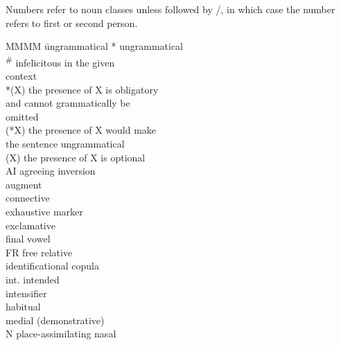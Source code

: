 \documentclass[output=paper]{langscibook}
\begin{document}
Numbers refer to noun classes unless followed by \SG{}/\PL{}, in which case the number refers to first or second person. 

\begin{multicols}{2}
\begin{tabbing}
MMMM \= ungrammatical\kill
* \> ungrammatical\\
\textsuperscript{\#} \> infelicitous in the given \\ \> context\\
*(X) \> the presence of X is obligatory \\ \> and cannot grammatically be \\ \> omitted\\
(*X) \> the presence of X would make \\ \> the sentence ungrammatical\\
(X) \> the presence of X is optional\\
AI \> agreeing inversion\\
\AUG{} \> augment\\
\CONN{} \> connective\\
\EXH{} \> exhaustive marker\\
\EXCLAM{} \> exclamative \\
\FV{} \>  final vowel\\
FR \>  free relative\\
\IDCOP{} \> identificational copula\\
int. \> intended\\
\INT{} \>  intensifier\\
\HAB{} \> habitual\\
\MED{} \> medial (demonstrative) \\
N \> place-assimilating nasal\\

\end{tabbing}
\end{multicols}
\end{document}
